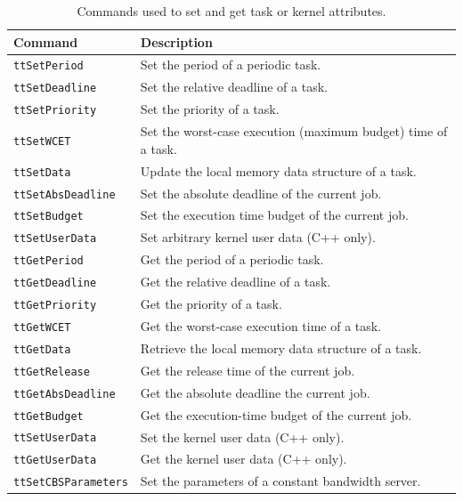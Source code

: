 \documentclass[final,twoside]{rapport}
\begin{document}
\enlargethispage{1em}

\begin{table}[htbp]
\caption{Commands used to set and get task or kernel attributes.}
\small
\label{table:getset}
\begin{center}
\begin{tabularx}{\hsize}{|l|>{\raggedright\arraybackslash}X|}
\hline
Command & Description \\ \hline
{\tt ttSetPeriod} & Set the period of a periodic task. \\
{\tt ttSetDeadline} & Set the relative deadline of a task. \\
{\tt ttSetPriority} & Set the priority of a task. \\
{\tt ttSetWCET} & Set the worst-case execution (maximum budget) time of a task. \\
{\tt ttSetData} & Update the local memory data structure of a task. \\
{\tt ttSetAbsDeadline} & Set the absolute deadline of the current job. \\
{\tt ttSetBudget} & Set the execution time budget of the current job. \\
{\tt ttSetUserData} & Set arbitrary kernel user data (C++ only). \\
{\tt ttGetPeriod} & Get the period of a periodic task. \\
{\tt ttGetDeadline} & Get the relative deadline of a task. \\
{\tt ttGetPriority} & Get the priority of a task. \\
{\tt ttGetWCET} & Get the worst-case execution time of a task. \\
{\tt ttGetData} & Retrieve the local memory data structure of a task. \\
{\tt ttGetRelease} & Get the release time of the current job. \\
{\tt ttGetAbsDeadline} & Get the absolute deadline the current job. \\
{\tt ttGetBudget} & Get the execution-time budget of the current job. \\
{\tt ttSetUserData} & Set the kernel user data (C++ only). \\
{\tt ttGetUserData} & Get the kernel user data (C++ only). \\
{\tt ttSetCBSParameters} & Set the parameters of a constant bandwidth server. \\
\hline
\end{tabularx}
\end{center}
\end{table}
\end{document}
